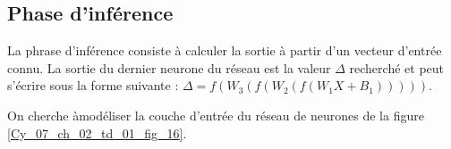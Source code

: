 \newpage

\subsection*{Phase d'inférence}
%
%
La phrase d'inférence consiste à calculer la sortie à partir d'un vecteur d'entrée connu. La sortie du dernier neurone du réseau est la valeur $\Delta$ recherché et peut s'écrire sous la forme suivante : 
$\Delta = f\left(W_3\left(f\left(W_2\left(f\left(W_1 X + B_1\right)\right)\right)\right)\right)$.
%

\ifprof
\begin{corrige}
\end{corrige}
\else
\fi

On cherche àmodéliser la couche d'entrée du réseau de neurones de la figure \ref{Cy_07_ch_02_td_01_fig_16}. 


